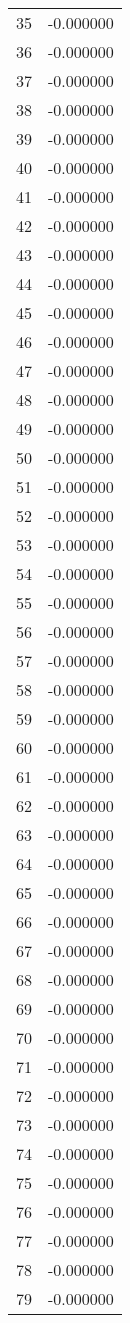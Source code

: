 \documentclass[12pt]{article}
\begin{document}
\begin{longtable}{@{}cc@{}}
35 & -0.000000 \\
36 & -0.000000 \\
37 & -0.000000 \\
38 & -0.000000 \\
39 & -0.000000 \\
40 & -0.000000 \\
41 & -0.000000 \\
42 & -0.000000 \\
43 & -0.000000 \\
44 & -0.000000 \\
45 & -0.000000 \\
46 & -0.000000 \\
47 & -0.000000 \\
48 & -0.000000 \\
49 & -0.000000 \\
50 & -0.000000 \\
51 & -0.000000 \\
52 & -0.000000 \\
53 & -0.000000 \\
54 & -0.000000 \\
55 & -0.000000 \\
56 & -0.000000 \\
57 & -0.000000 \\
58 & -0.000000 \\
59 & -0.000000 \\
60 & -0.000000 \\
61 & -0.000000 \\
62 & -0.000000 \\
63 & -0.000000 \\
64 & -0.000000 \\
65 & -0.000000 \\
66 & -0.000000 \\
67 & -0.000000 \\
68 & -0.000000 \\
69 & -0.000000 \\
70 & -0.000000 \\
71 & -0.000000 \\
72 & -0.000000 \\
73 & -0.000000 \\
74 & -0.000000 \\
75 & -0.000000 \\
76 & -0.000000 \\
77 & -0.000000 \\
78 & -0.000000 \\
79 & -0.000000 \\

\end{longtable}
\end{document}
